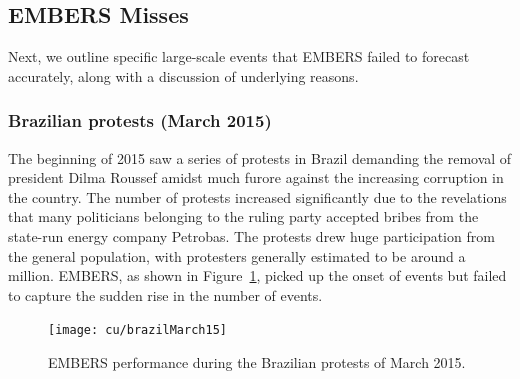 



\subsection{EMBERS Misses}
Next, we outline specific large-scale events that
EMBERS failed to forecast accurately, along with a discussion of underlying
reasons.

\subsubsection{Brazilian protests (March 2015)}
The beginning of 2015 saw a series of protests in Brazil demanding the
removal of president Dilma Roussef amidst much furore against the increasing corruption in the country.
The number of protests
increased significantly due to the revelations that many politicians belonging
to the ruling party accepted bribes from the state-run energy company Petrobas. The protests drew huge participation from
the general population, with protesters generally estimated to be around a
million. EMBERS, as shown in Figure~\ref{fig:brazilSpring},
picked up the onset of events but failed to capture the sudden rise 
in the number of events.

\begin{figure}
\centering
\texttt{[image: cu/brazilMarch15]}
\caption{EMBERS performance during the Brazilian protests of March 2015.}
\label{fig:brazilSpring}
\end{figure}

